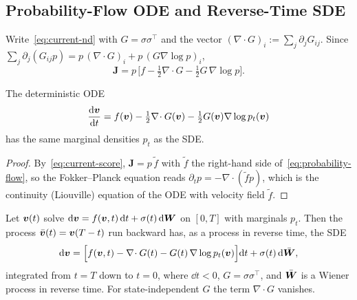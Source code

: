 \subsection{Probability-Flow ODE and Reverse-Time SDE}

Write~\eqref{eq:current-nd} with $G=\sigma\sigma^\top$ and the vector $(\nabla\!\cdot G)_i:=\sum_j\partial_jG_{ij}$. Since $\sum_j\partial_j(G_{ij}p)=p\,(\nabla\!\cdot G)_i+p\,(G\nabla\log p)_i$,
\begin{equation}
\label{eq:current-score}
\bm J=p\,\Big[f-\tfrac12\nabla\!\cdot G-\tfrac12G\,\nabla\log p\Big].
\end{equation}

\begin{proposition}
\label{prop:probability-flow}
The deterministic ODE
\begin{equation}
\label{eq:probability-flow}
\frac{\mathrm{d}\bm{v}}{\mathrm{d} t}=f(\bm{v})-\tfrac12\nabla\!\cdot G(\bm{v})-\tfrac12G(\bm{v})\nabla\log p_t(\bm{v})
\end{equation}
has the same marginal densities $p_t$ as the SDE.
\end{proposition}

\begin{proof}
By~\eqref{eq:current-score}, $\bm J=p\,\tilde f$ with $\tilde f$ the right-hand side of~\eqref{eq:probability-flow}, so the Fokker--Planck equation reads $\partial_tp=-\nabla\!\cdot(\tilde f p)$, which is the continuity (Liouville) equation of the ODE with velocity field $\tilde f$.
\end{proof}

\begin{theorem}
\label{thm:reverse-sde}
Let $\bm{v}(t)$ solve $\mathrm{d}\bm{v}=f(\bm{v},t)\,\mathrm{d} t+\sigma(t)\,\mathrm{d}\bm{W}$ on $[0,T]$ with marginals $p_t$. Then the process $\bar{\bm{v}}(t)=\bm{v}(T-t)$ run backward has, as a process in reverse time, the SDE
\begin{equation}
\label{eq:reverse-sde}
\mathrm{d}\bm{v}=\Big[f(\bm{v},t)-\nabla\!\cdot G(t)-G(t)\,\nabla\log p_t(\bm{v})\Big]\mathrm{d} t+\sigma(t)\,\mathrm{d}\bar{\bm{W}},
\end{equation}
integrated from $t=T$ down to $t=0$, where $\dd t<0$, $G=\sigma\sigma^\top$, and $\bar{\bm{W}}$ is a Wiener process in reverse time. For state-independent $G$ the term $\nabla\!\cdot G$ vanishes.
\end{theorem}

